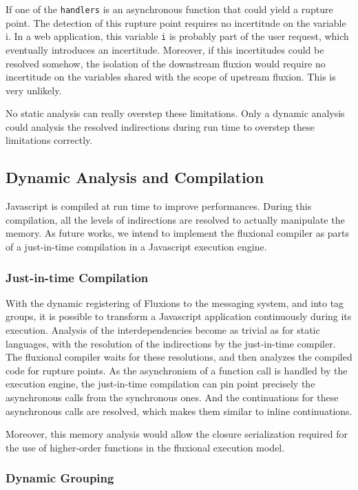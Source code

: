 If one of the \texttt{handlers} is an asynchronous function that could yield a rupture point.
The detection of this rupture point requires no incertitude on the variable i.
In a web application, this variable \texttt{i} is probably part of the user request, which eventually introduces an incertitude.
Moreover, if this incertitudes could be resolved somehow, the isolation of the downstream fluxion would require no incertitude on the variables shared with the scope of upstream fluxion.
This is very unlikely.

No static analysis can really overstep these limitations.
Only a dynamic analysis could analysis the resolved indirections during run time to overstep these limitations correctly.

\subsection{Dynamic Analysis and Compilation}

Javascript is compiled at run time to improve performances.
During this compilation, all the levels of indirections are resolved to actually manipulate the memory.
As future works, we intend to implement the fluxional compiler as parts of a just-in-time compilation in a Javascript execution engine.

\subsubsection{Just-in-time Compilation}

With the dynamic registering of Fluxions to the messaging system, and into tag groups, it is possible to transform a Javascript application continuously during its execution.
Analysis of the interdependencies become as trivial as for static languages, with the resolution of the indirections by the just-in-time compiler.
The fluxional compiler waits for these resolutions, and then analyzes the compiled code for rupture points.
As the asynchronism of a function call is handled by the execution engine, the just-in-time compilation can pin point precisely the asynchronous calls from the synchronous ones. 
And the continuations for these asynchronous calls are resolved, which makes them similar to inline continuations.

Moreover, this memory analysis would allow the closure serialization required for the use of higher-order functions in the fluxional execution model.

\subsubsection{Dynamic Grouping}


